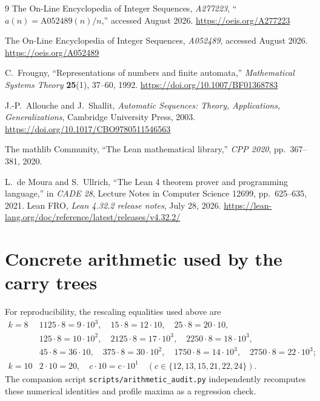 \documentclass[11pt]{article}
\begin{document}
\begin{thebibliography}{9}
The On-Line Encyclopedia of Integer Sequences, \emph{A277223}, ``$a(n)=\mathrm{A052489}(n)/n$,'' accessed August 2026.
\url{https://oeis.org/A277223}

The On-Line Encyclopedia of Integer Sequences, \emph{A052489}, accessed August 2026.
\url{https://oeis.org/A052489}

C.~Frougny,
``Representations of numbers and finite automata,''
\emph{Mathematical Systems Theory} \textbf{25}(1), 37--60, 1992.
\url{https://doi.org/10.1007/BF01368783}

J.-P.~Allouche and J.~Shallit,
\emph{Automatic Sequences: Theory, Applications, Generalizations},
Cambridge University Press, 2003.
\url{https://doi.org/10.1017/CBO9780511546563}

The mathlib Community,
``The Lean mathematical library,''
\emph{CPP 2020}, pp.~367--381, 2020.

L.~de Moura and S.~Ullrich,
``The Lean 4 theorem prover and programming language,''
in \emph{CADE 28}, Lecture Notes in Computer Science 12699, pp.~625--635, 2021.
Lean FRO,
\emph{Lean 4.32.2 release notes}, July 28, 2026.
\url{https://lean-lang.org/doc/reference/latest/releases/v4.32.2/}

\end{thebibliography}

\appendix
\section{Concrete arithmetic used by the carry trees}
For reproducibility, the rescaling equalities used above are
\[
\begin{array}{c|c}
 k=8 &
1125\cdot8=9\cdot10^3,\quad
15\cdot8=12\cdot10,\quad
25\cdot8=20\cdot10,\\
&125\cdot8=10\cdot10^2,\quad
2125\cdot8=17\cdot10^3,\quad
2250\cdot8=18\cdot10^3,\\
&45\cdot8=36\cdot10,\quad
375\cdot8=30\cdot10^2,\quad
1750\cdot8=14\cdot10^3,\quad
2750\cdot8=22\cdot10^3;\\[1ex]
 k=10 &
2\cdot10=20,\quad
c\cdot10=c\cdot10^1\quad(c\in\{12,13,15,21,22,24\}).
\end{array}
\]
The companion script \texttt{scripts/arithmetic\_audit.py} independently recomputes these numerical identities and profile maxima as a regression check.
\end{document}
